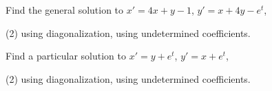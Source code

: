 \documentclass{ximera}
\begin{document}
\begin{exercise}
    Find the general solution to $x' = 4x+ y -1$,  $y' = x + 4y -e^t$,
    \begin{tasks}(2)
        \task using diagonalization,
        \task using undetermined coefficients.
    \end{tasks}
\end{exercise}

\begin{exercise}%
    Find a particular solution to $x' = y + e^t$, $y' = x +e^t$,
    \begin{tasks}(2)
        \task using diagonalization,
        \task using undetermined coefficients.
    \end{tasks}
\end{exercise}
\end{document}
